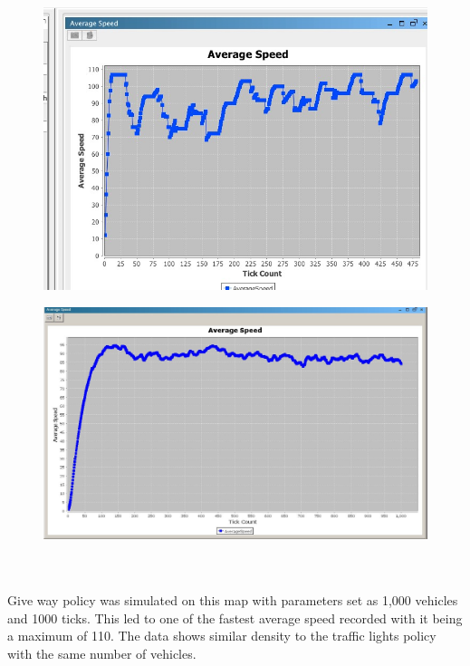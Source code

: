 \documentclass[11pt]{article}
\begin{document}
\begin{enumerate}
\begin{figure}[h!]
\begin{center}
\includegraphics[scale=0.4]{AVG_speed}
\caption{}
\end{center}
\end{figure}

\begin{figure}[h!]
\begin{center}
\includegraphics[scale=0.2]{screenshot}
\caption{}
\end{center}
\end{figure}\hfill \\
\hfill \\

Give way policy was simulated on this map with parameters set as 1,000 vehicles and 1000 ticks. This led to one of the fastest average speed recorded with it being a maximum of 110. The data shows similar density to the traffic lights policy with the same number of vehicles.


\end{enumerate}
\end{document}
